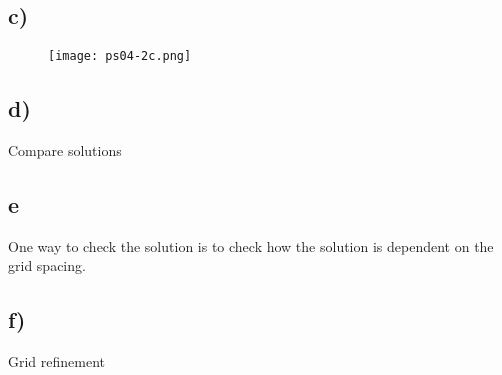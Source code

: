 \documentclass{article}
\begin{document}
\subsection{c)}
\begin{figure}
	\texttt{[image: ps04-2c.png]}
\end{figure}

\subsection{d)}
Compare solutions

\subsection{e}
One way to check the solution is to check how the solution is dependent on the grid spacing.

\subsection{f)}
Grid refinement
\end{document}
